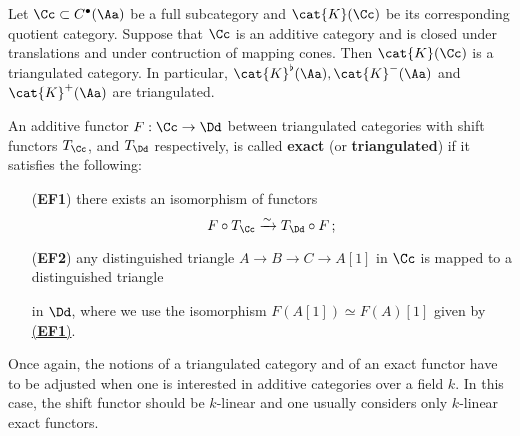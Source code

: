 \begin{cor}
    Let $\Cc \subset C^{\bullet}(\Aa)$ be a full subcategory
    and $\cat{K}(\Cc)$ be its corresponding quotient category.
    Suppose that $\Cc$ is an additive category and is closed
    under translations and under contruction of mapping cones.
    Then $\cat{K}(\Cc)$ is a triangulated category.
    In particular, $\cat{K}^{\flat}(\Aa), \cat{K}^{-}(\Aa)$ and
    $\cat{K}^{+}(\Aa)$ are triangulated.
\end{cor}

\begin{df}
    An additive functor $F: \Cc \to \Dd$ 
    between triangulated categories
    with shift functors $T_{\Cc}$, and $T_{\Dd}$
    respectively, is called \textbf{exact} 
    (or \textbf{triangulated}) if it satisfies
    the following:
    \begin{itemize}
        \item[(\textbf{EF1})]\label{EF1} 
        there exists an isomorphism of functors
        \begin{equation*}
            F \circ T_{\Cc} \xrightarrow[]{\sim} T_{\Dd} \circ F\,;
        \end{equation*}

        \item[(\textbf{EF2})]\label{EF2} 
        any distinguished triangle $A \to B \to C \to A[1]$
        in $\Cc$ is mapped to a distinguished triangle
        \begin{center}
        \end{center}
        in $\Dd$, where we use the isomorphism $F(A[1]) \simeq F(A)[1]$
        given by \hyperref[EF1]{(\textbf{EF1})}.
    \end{itemize}
\end{df}

\begin{rmk}
    Once again, the notions of a triangulated category 
    and of an exact functor have to be adjusted 
    when one is interested in additive categories over a field $k$.
    In this case, the shift functor should be $k$-linear 
    and one usually considers only $k$-linear exact functors.
\end{rmk}

